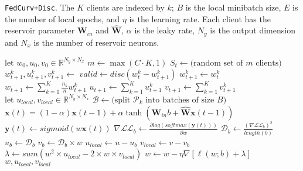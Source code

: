 \algrenewcommand\algorithmicfunction{}
\algrenewcommand\textproc{}
\begin{algorithm}[H]
\caption{\texttt{FedCurv+Disc}. The $K$ clients are indexed by $k$; $B$ is the local minibatch size, $E$ is the number of local epochs, and $\eta$ is the learning rate. Each client has the reservoir parameter $\textbf{W}_{in}$ and $\widehat{\textbf{W}}$, $\alpha$ is the leaky rate, $N_y$ is the output dimension and $N_x$ is the number of reservoir neurons.}\label{alg:fedcurv+disc}
\begin{algorithmic}[1]
    \State let $w_0, u_0, v_0\in \mathbb{R}^{N_y\times N_x}$
        \State $m\leftarrow \max(C\cdot K, 1)$
        \State $S_t\leftarrow \text{(random set of $m$ clients)}$
            \State $w_{t+1}^k, u_{t+1}^k, v_{t+1}^k\leftarrow$ 
            \State $valid\leftarrow disc(w_t^k-w_{t+1}^k)$
                $w_{t+1}^k\leftarrow w_t^k$
            \EndIf
        \EndFor
        \State $w_{t+1}\leftarrow \sum_{k=1}^K\frac{n_k}{n}w_{t+1}^k$
        \State $u_{t+1}\leftarrow \sum_{k=1}^K u_{t+1}^k$
        \State $v_{t+1}\leftarrow \sum_{k=1}^K v_{t+1}^k$
    \EndFor
\EndFunction
\\
    \State let $u_{local}, v_{local}\in \mathbb{R}^{N_y\times N_x}$
    \State $\mathcal{B}\leftarrow \text{(split $\mathcal{P}_k$ into batches of size $B$)}$
            \State $\textbf{x}(t)=(1-\alpha)\textbf{x}(t-1)+\alpha \tanh(\textbf{W}_{in}b+\widehat{\textbf{W}}\textbf{x}(t-1))$
            \State $\textbf{y}(t)\leftarrow sigmoid(w\textbf{x}(t))$
            \State $\nabla\mathcal{LL}_b\leftarrow\frac{\partial log(softmax(\textbf{y}(t)))}{\partial w}$ 
            \State $\mathcal{D}_b\leftarrow\frac{(\nabla\mathcal{LL}_b)^{2}}{length(b)}$ 
            \State $u_b\leftarrow\mathcal{D}_b$
            \State $v_b\leftarrow\mathcal{D}_b\times w$
            \State $u_{local} \leftarrow u-u_b$
            \State $v_{local} \leftarrow v-v_b$
            \State $\lambda\leftarrow sum(w^2\times u_{local}-2\times w\times v_{local})$ 
            \State $w\leftarrow w-\eta\nabla[\ell(w;b)+\lambda]$
        \EndFor
    \EndFor
    \Return $w, u_{local}, v_{local}$
\EndFunction
\end{algorithmic}
\end{algorithm}